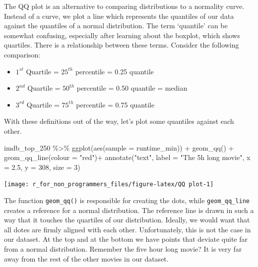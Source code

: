 \documentclass[
]{book}
\newenvironment{Shaded}{\begin{snugshade}}{\end{snugshade}}
\newcommand{\AttributeTok}[1]{\textcolor[rgb]{0.77,0.63,0.00}{#1}}
\newcommand{\DecValTok}[1]{\textcolor[rgb]{0.00,0.00,0.81}{#1}}
\newcommand{\FloatTok}[1]{\textcolor[rgb]{0.00,0.00,0.81}{#1}}
\newcommand{\FunctionTok}[1]{\textcolor[rgb]{0.00,0.00,0.00}{#1}}
\newcommand{\NormalTok}[1]{#1}
\newcommand{\SpecialCharTok}[1]{\textcolor[rgb]{0.00,0.00,0.00}{#1}}
\newcommand{\StringTok}[1]{\textcolor[rgb]{0.31,0.60,0.02}{#1}}
\begin{document}
The QQ plot is an alternative to comparing distributions to a normality curve. Instead of a curve, we plot a line which represents the quantiles of our data against the quantiles of a normal distribution. The term `quantile' can be somewhat confusing, especially after learning about the boxplot, which shows quartiles. There is a relationship between these terms. Consider the following comparison:

\begin{itemize}
\item
  \(1^{st}\) Quartile = \(25^{th}\) percentile = 0.25 quantile
\item
  \(2^{nd}\) Quartile = \(50^{th}\) percentile = 0.50 quantile = median
\item
  \(3^{rd}\) Quartile = \(75^{th}\) percentile = 0.75 quantile
\end{itemize}

With these definitions out of the way, let's plot some quantiles against each other.

\begin{Shaded}
\begin{Highlighting}[]
\NormalTok{imdb\_top\_250 }\SpecialCharTok{\%\textgreater{}\%}
  \FunctionTok{ggplot}\NormalTok{(}\FunctionTok{aes}\NormalTok{(}\AttributeTok{sample =}\NormalTok{ runtime\_min)) }\SpecialCharTok{+}
  \FunctionTok{geom\_qq}\NormalTok{() }\SpecialCharTok{+}
  \FunctionTok{geom\_qq\_line}\NormalTok{(}\AttributeTok{colour =} \StringTok{"red"}\NormalTok{)}\SpecialCharTok{+}
  \FunctionTok{annotate}\NormalTok{(}\StringTok{"text"}\NormalTok{,}
           \AttributeTok{label =} \StringTok{"The 5h long movie"}\NormalTok{,}
           \AttributeTok{x =} \FloatTok{2.5}\NormalTok{,}
           \AttributeTok{y =} \DecValTok{308}\NormalTok{,}
           \AttributeTok{size =} \DecValTok{3}\NormalTok{)}
\end{Highlighting}
\end{Shaded}

\begin{center}\texttt{[image: r\_for\_non\_programmers\_files/figure-latex/QQ plot-1]} \end{center}

The function \texttt{geom\_qq()} is responsible for creating the dots, while \texttt{geom\_qq\_line} creates a reference for a normal distribution. The reference line is drawn in such a way that it touches the quartiles of our distribution. Ideally, we would want that all dotes are firmly aligned with each other. Unfortunately, this is not the case in our dataset. At the top and at the bottom we have points that deviate quite far from a normal distribution. Remember the five hour long movie? It is very far away from the rest of the other movies in our dataset.
\end{document}
